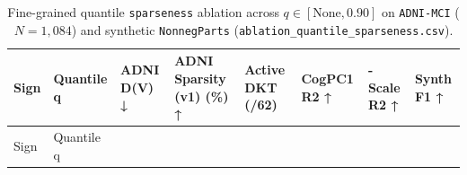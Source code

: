\documentclass[
  10pt,
  letterpaper,
]{report}
\begin{document}
\begin{longtable}[]{@{}
  >{\raggedright\arraybackslash}p{}
  >{\raggedright\arraybackslash}p{}
  >{\raggedleft\arraybackslash}p{}
  >{\raggedleft\arraybackslash}p{}
  >{\raggedleft\arraybackslash}p{}
  >{\raggedleft\arraybackslash}p{}
  >{\raggedleft\arraybackslash}p{}
  >{\raggedleft\arraybackslash}p{}@{}}
\caption{Fine-grained quantile \protect\texttt{sparseness} ablation
across \(q \in [\text{None}, 0.90]\) on \protect\texttt{ADNI-MCI}
(\(N = 1,084\)) and synthetic \protect\texttt{NonnegParts}
(\protect\texttt{ablation\_quantile\_sparseness.csv}).}\label{tbl-app-quantile-grid}\tabularnewline
\toprule\noalign{}
\begin{minipage}[b]{\linewidth}\raggedright
Sign
\end{minipage} & \begin{minipage}[b]{\linewidth}\raggedright
Quantile q
\end{minipage} & \begin{minipage}[b]{\linewidth}\raggedleft
ADNI D(V) ↓
\end{minipage} & \begin{minipage}[b]{\linewidth}\raggedleft
ADNI Sparsity (v1) (\%) ↑
\end{minipage} & \begin{minipage}[b]{\linewidth}\raggedleft
Active DKT (/62)
\end{minipage} & \begin{minipage}[b]{\linewidth}\raggedleft
CogPC1 R2 ↑
\end{minipage} & \begin{minipage}[b]{\linewidth}\raggedleft
11-Scale R2 ↑
\end{minipage} & \begin{minipage}[b]{\linewidth}\raggedleft
Synth F1 ↑
\end{minipage} \\
\midrule\noalign{}
\endfirsthead
\toprule\noalign{}
\begin{minipage}[b]{\linewidth}\raggedright
Sign
\end{minipage} & \begin{minipage}[b]{\linewidth}\raggedright
Quantile q
\end{minipage} & \begin{minipage}[b]{\linewidth}\raggedleft

\end{minipage}
\end{longtable}
\end{document}
